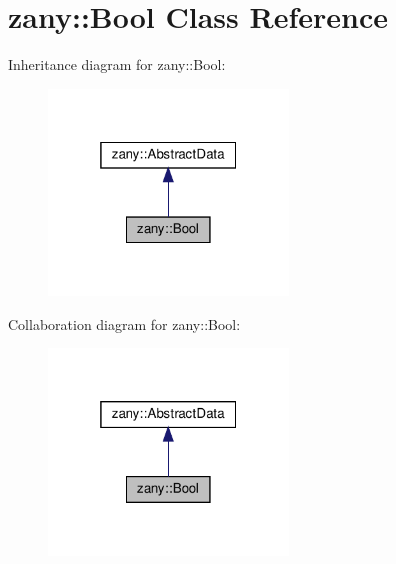 \hypertarget{classzany_1_1_bool}{}\section{zany\+:\+:Bool Class Reference}
\label{classzany_1_1_bool}


Inheritance diagram for zany\+:\+:Bool\+:
\nopagebreak
\begin{figure}[H]
\begin{center}
\leavevmode
\includegraphics[width=181pt]{classzany_1_1_bool__inherit__graph}
\end{center}
\end{figure}


Collaboration diagram for zany\+:\+:Bool\+:
\nopagebreak
\begin{figure}[H]
\begin{center}
\leavevmode
\includegraphics[width=181pt]{classzany_1_1_bool__coll__graph}
\end{center}
\end{figure}
